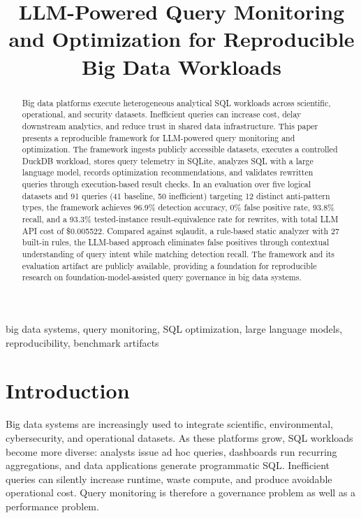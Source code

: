 \documentclass[conference]{IEEEtran}
\begin{document}
\title{LLM-Powered Query Monitoring and Optimization for Reproducible Big Data Workloads}

\author{
}

\maketitle

\begin{abstract}
Big data platforms execute heterogeneous analytical SQL workloads across scientific, operational, and security datasets. Inefficient queries can increase cost, delay downstream analytics, and reduce trust in shared data infrastructure. This paper presents a reproducible framework for LLM-powered query monitoring and optimization. The framework ingests publicly accessible datasets, executes a controlled DuckDB workload, stores query telemetry in SQLite, analyzes SQL with a large language model, records optimization recommendations, and validates rewritten queries through execution-based result checks. In an evaluation over five logical datasets and 91 queries (41 baseline, 50 inefficient) targeting 12 distinct anti-pattern types, the framework achieves 96.9\% detection accuracy, 0\% false positive rate, 93.8\% recall, and a 93.3\% tested-instance result-equivalence rate for rewrites, with total LLM API cost of \$0.005522. Compared against sqlaudit, a rule-based static analyzer with 27 built-in rules, the LLM-based approach eliminates false positives through contextual understanding of query intent while matching detection recall. The framework and its evaluation artifact are publicly available, providing a foundation for reproducible research on foundation-model-assisted query governance in big data systems.
\end{abstract}

\begin{IEEEkeywords}
big data systems, query monitoring, SQL optimization, large language models, reproducibility, benchmark artifacts
\end{IEEEkeywords}

\section{Introduction}
Big data systems are increasingly used to integrate scientific, environmental, cybersecurity, and operational datasets. As these platforms grow, SQL workloads become more diverse: analysts issue ad hoc queries, dashboards run recurring aggregations, and data applications generate programmatic SQL. Inefficient queries can silently increase runtime, waste compute, and produce avoidable operational cost. Query monitoring is therefore a governance problem as well as a performance problem.
\end{document}
